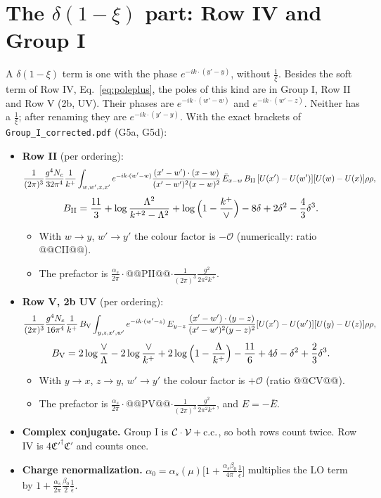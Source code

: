 \documentclass[10pt]{article}
\numberwithin{equation}{section}
\newcommand{\OO}{\mathcal O}
\newcommand{\pre}{\frac{1}{(2\pi)^3}\frac{g^2}{2\pi^2k^+}}
\begin{document}
\section{The \texorpdfstring{$\delta(1-\xi)$}{delta(1-xi)} part: Row IV and Group I}\label{sec:delta}
A $\delta(1-\xi)$ term is one with the phase $e^{-ik\cdot(y'-y)}$, without $\frac1\xi$. Besides the soft term of Row IV, Eq.~\eqref{eq:poleplus}, the poles of this kind are in Group I, Row II and Row V (2b, UV). Their phases are $e^{-ik\cdot(w'-w)}$ and $e^{-ik\cdot(w'-z)}$. Neither has a $\frac1\xi$; after renaming they are $e^{-ik\cdot(y'-y)}$. With the exact brackets of \texttt{Group\_I\_corrected.pdf} (G5a, G5d):
\begin{itemize}
\item \textbf{Row II} (per ordering):
\begin{equation*}
\frac{1}{(2\pi)^3}\frac{g^4N_c}{32\pi^4}\frac1{k^+}\int_{w,w',x,x'}e^{-ik\cdot(w'-w)}\frac{(x'-w')\cdot(x-w)}{(x'-w')^2(x-w)^2}\,\bar E_{x-w}\,B_{\rm II}\,[U(x')-U(w')][U(w)-U(x)]\rho\rho,
\end{equation*}
\begin{equation*}
B_{\rm II}=\frac{11}{3}+\log\frac{\Lambda^2}{k^{+2}-\Lambda^2}+\log\Big(1-\frac{k^+}{\vee}\Big)-8\delta+2\delta^2-\frac43\delta^3 .
\end{equation*}
\begin{itemize}
\item With $w\to y$, $w'\to y'$ the colour factor is $-\OO$ (numerically: ratio @@CII@@).
\item The prefactor is $\frac{\alpha_s}{2\pi}\cdot$@@PII@@$\cdot\pre$.
\end{itemize}
\item \textbf{Row V, 2b UV} (per ordering):
\begin{equation*}
\frac{1}{(2\pi)^3}\frac{g^4N_c}{16\pi^4}\frac1{k^+}\,B_{\rm V}\int_{y,z,x',w'}e^{-ik\cdot(w'-z)}\,E_{y-z}\,\frac{(x'-w')\cdot(y-z)}{(x'-w')^2(y-z)^2}[U(x')-U(w')][U(y)-U(z)]\rho\rho,
\end{equation*}
\begin{equation*}
B_{\rm V}=2\log\frac{\vee}{\Lambda}-2\log\frac{\vee}{k^+}+2\log\Big(1-\frac{\Lambda}{k^+}\Big)-\frac{11}{6}+4\delta-\delta^2+\frac23\delta^3 .
\end{equation*}
\begin{itemize}
\item With $y\to x$, $z\to y$, $w'\to y'$ the colour factor is $+\OO$ (ratio @@CV@@).
\item The prefactor is $\frac{\alpha_s}{2\pi}\cdot$@@PV@@$\cdot\pre$, and $E=-\bar E$.
\end{itemize}
\item \textbf{Complex conjugate.} Group I is $\mathcal C\cdot\mathcal V+{\rm c.c.}$, so both rows count twice. Row IV is $4\mathfrak C'^\dagger\mathfrak C'$ and counts once.
\item \textbf{Charge renormalization.} $\alpha_0=\alpha_s(\mu)\big[1+\frac{\alpha_s\beta_0}{4\pi}\frac1{\bar\epsilon}\big]$ multiplies the LO term by $1+\frac{\alpha_s}{2\pi}\frac{\beta_0}{2}\frac1{\bar\epsilon}$.
\end{itemize}
\end{document}
